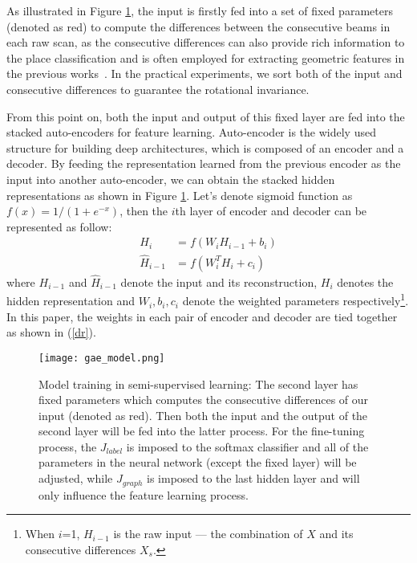\documentclass[letterpaper, 10 pt, conference]{ieeeconf}  %
\begin{document}
As illustrated in Figure \ref{model}, the input is firstly fed into a set of fixed parameters (denoted as red) to compute the differences between the consecutive beams in each raw scan, as the consecutive differences can also provide rich information to the place classification and is often employed for extracting geometric features in the previous works~\cite{mozos2005supervised,sousa2007real}. In the practical experiments, we sort both of the input and consecutive differences to guarantee the rotational invariance.

From this point on, both the input and output of this fixed layer are fed into the stacked auto-encoders for feature learning.  Auto-encoder is the widely used structure for building deep architectures, which is composed of an encoder and a decoder. By feeding the representation learned from the previous encoder as the input into another auto-encoder, we can obtain the stacked hidden representations as shown in Figure \ref{model}. Let's denote sigmoid function as $f(x)=1/(1+e^{-x})$, then the $i$th layer of encoder and decoder can be represented as follow:
\begin{equation}\label{dr}
\begin{split}
  H_i &= f(W_iH_{i-1}+b_i)\\
  \hat{H}_{i-1} &= f(W_i^TH_i+c_i)
\end{split}
\end{equation}
where $H_{i-1}$ and $\hat{H}_{i-1}$ denote the input and its reconstruction, $H_i$ denotes the hidden representation and $W_i,b_i,c_i$ denote the weighted parameters respectively\footnote{When $i$=1, $H_{i-1}$ is the raw input --- the combination of $X$ and its consecutive differences $X_s$.}. In this paper, the weights in each pair of encoder and decoder are tied together as shown in (\ref{dr}).

\begin{figure}[tpb]
\centering
\texttt{[image: gae\_model.png]}
\caption{Model training in semi-supervised learning: The second layer has fixed parameters which computes the consecutive differences of our input (denoted as red). Then both the input and the output of the second layer will be fed into the latter process. For the fine-tuning process, the $J_{label}$ is imposed to the softmax classifier and all of the parameters in the neural network (except the fixed layer) will be adjusted, while $J_{graph}$ is imposed to the last hidden layer and will only influence the feature learning process. }
\label{model}
\end{figure}
\end{document}
